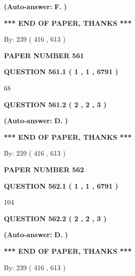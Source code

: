 \documentclass{ctexart}
\begin{document}
 
{\textbf{(Auto-answer:}}
{\textbf{\large{
F.}}}
{\textbf{)}}
 
 
   
   
   
   
\vspace{1.0in} 
{\textbf{\large{ *** END OF PAPER, THANKS *** }}} 
   
   
\hspace{1.0in} By: 
 239 ( 416 ,  613 )
   
   
   
   
\newpage 
\setcounter{page}{ 
   561001 } 
   
   
 {\textbf{ \Large{ PAPER NUMBER  561  }}}
   
   
   
   
  
  
{\textbf{\large{QUESTION
561.1 
 ( 1 , 1 , 6791 )
}}}

68
  
  
{\textbf{\large{QUESTION
561.2 
 ( 2 , 2 , 3 )
}}}
 
 
{\textbf{(Auto-answer:}}
{\textbf{\large{
D.}}}
{\textbf{)}}
 
 
   
   
   
   
\vspace{1.0in} 
{\textbf{\large{ *** END OF PAPER, THANKS *** }}} 
   
   
\hspace{1.0in} By: 
 239 ( 416 ,  613 )
   
   
   
   
\newpage 
\setcounter{page}{ 
   562001 } 
   
   
 {\textbf{ \Large{ PAPER NUMBER  562  }}}
   
   
   
   
  
  
{\textbf{\large{QUESTION
562.1 
 ( 1 , 1 , 6791 )
}}}

104
  
  
{\textbf{\large{QUESTION
562.2 
 ( 2 , 2 , 3 )
}}}
 
 
{\textbf{(Auto-answer:}}
{\textbf{\large{
D.}}}
{\textbf{)}}
 
 
   
   
   
   
\vspace{1.0in} 
{\textbf{\large{ *** END OF PAPER, THANKS *** }}} 
   
   
\hspace{1.0in} By: 
 239 ( 416 ,  613 )
   
   
   
\end{document}
